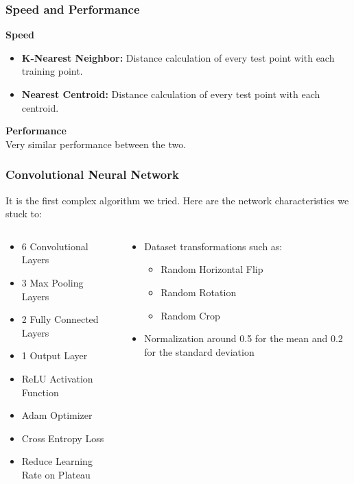 \begin{frame}
\frametitle{Speed and Performance}
\center \textbf{Speed}
\begin{itemize}
    \item \textbf{K-Nearest Neighbor:} Distance calculation of every test point with each training point.
    \item \textbf{Nearest Centroid:} Distance calculation of every test point with each centroid.
\end{itemize}
\center \textbf{Performance}\\
Very similar performance between the two.
\end{frame}

\begin{frame}
\frametitle{Convolutional Neural Network}
It is the first complex algorithm we tried. Here are the network characteristics we stuck to:
\begin{columns}
    \begin{column}{0.5\textwidth}
        \begin{itemize}
            \item 6 Convolutional Layers
            \item 3 Max Pooling Layers
            \item 2 Fully Connected Layers
            \item 1 Output Layer
            \item ReLU Activation Function
            \item Adam Optimizer
            \item Cross Entropy Loss
            \item Reduce Learning Rate on Plateau
        \end{itemize}
    \end{column}
    \begin{column}{0.5\textwidth}
        \begin{itemize}
            \item Dataset transformations such as:
            \begin{itemize}
                \item Random Horizontal Flip
                \item Random Rotation
                \item Random Crop    
            \end{itemize}
            \item Normalization around 0.5 for the mean and 0.2 for the standard deviation
        \end{itemize}
    \end{column}
\end{columns}
\end{frame}


